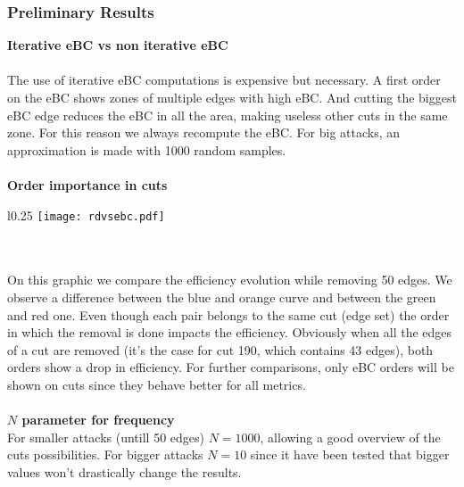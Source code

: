 \documentclass{article}
\begin{document}
\subsubsection{Preliminary Results}
\textbf{Iterative eBC vs non iterative eBC}\\
\vspace{1pt}\\
The use of iterative eBC computations is expensive but necessary. A first order on the eBC shows zones of multiple edges with high eBC. And cutting the biggest eBC edge reduces the eBC in all the area, making useless other cuts in the same zone. For this reason we always recompute the eBC. For big attacks, an approximation is made with 1000 random samples.\\
\vspace{1pt}\\
\textbf{Order importance in cuts}\\
\begin{wrapfigure}[12]{l}{0.25\textwidth}
    \texttt{[image: rdvsebc.pdf]}\\
\end{wrapfigure}\\
\vspace{10pt}\\
On this graphic we compare the efficiency evolution while removing 50 edges. We observe a difference between the blue and orange curve and between the green and red one. Even though each pair belongs to the same cut (edge set) the order in which the removal is done impacts the efficiency. Obviously when all the edges of a cut are removed (it's the case for cut 190, which contains 43 edges), both orders show a drop in efficiency. For further comparisons, only eBC orders will be shown on cuts since they behave better for all metrics.\\
\vspace{50pt}\\
\textbf{$N$ parameter for frequency}\\
For smaller attacks (untill 50 edges) $N = 1000$, allowing a good overview of the cuts possibilities. For bigger attacks $N = 10$ since it have been tested that bigger values won't drastically change the results.\\
\end{document}
